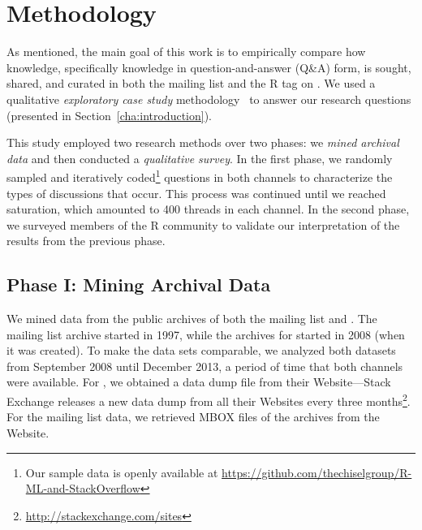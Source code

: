 \section{Methodology}
\label{cha:methodology}

As mentioned, the main goal of this work is to empirically compare how knowledge, specifically knowledge in question-and-answer (Q\&A) form, is sought, shared, and curated in both the \RH mailing list and the R tag on \SO. We used a qualitative \textit{exploratory case study} methodology~\cite{Creswell2009,Runeson2012} to answer our research questions (presented in Section~\ref{cha:introduction}).


This study employed two research methods over two phases: we \textit{mined archival data} and then conducted a \textit{qualitative survey}. In the first phase,
we randomly sampled and iteratively coded\footnote{Our sample data is openly available at \url{https://github.com/thechiselgroup/R-ML-and-StackOverflow}} questions in both channels to characterize the types of discussions that occur. This process was continued until we reached saturation, which amounted to 400 threads in each channel. In the second phase, we surveyed members of the R community to validate our interpretation of the results from the previous phase. %

\subsection{Phase I: Mining Archival Data} 
\label{sec:studyDesign}
We mined data from the public archives of both the \RH mailing list and \SO. The \RH mailing list archive started in 1997, while the archives for \SO started in 2008 (when it was created).
To make the data sets comparable, we analyzed both datasets from September 2008 until December 2013, a period of time that both channels were available.
For \SO, we obtained a data dump file from their Website---Stack Exchange releases a new data dump from all their Websites every three months\footnote{\url{http://stackexchange.com/sites}}. For the \RH mailing list data, we retrieved MBOX files of the archives from the \RH Website.

